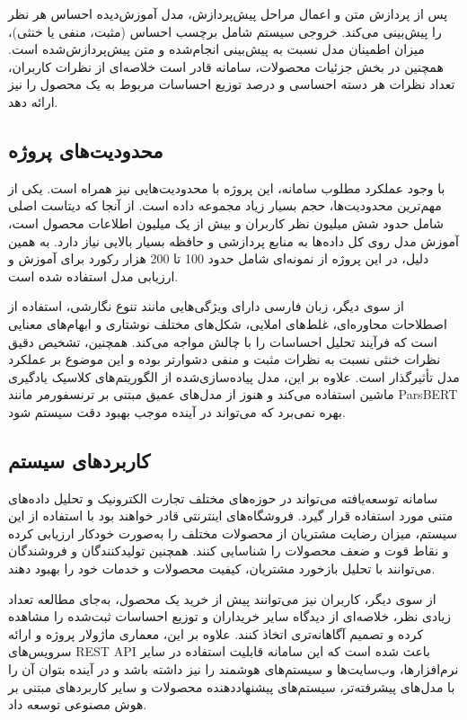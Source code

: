 پس از پردازش متن و اعمال مراحل پیش‌پردازش، مدل آموزش‌دیده احساس هر نظر را پیش‌بینی می‌کند. خروجی سیستم شامل برچسب احساس (مثبت، منفی یا خنثی)، میزان اطمینان مدل نسبت به پیش‌بینی انجام‌شده  و متن پیش‌پردازش‌شده است. همچنین در بخش جزئیات محصولات، سامانه قادر است خلاصه‌ای از نظرات کاربران، تعداد نظرات هر دسته احساسی و درصد توزیع احساسات مربوط به یک محصول را نیز ارائه دهد.
\subsection{محدودیت‌های پروژه}
با وجود عملکرد مطلوب سامانه، این پروژه با محدودیت‌هایی نیز همراه است. یکی از مهم‌ترین محدودیت‌ها، حجم بسیار زیاد مجموعه داده است. از آنجا که دیتاست اصلی شامل حدود شش میلیون نظر کاربران و بیش از یک میلیون اطلاعات محصول است، آموزش مدل روی کل داده‌ها به منابع پردازشی و حافظه بسیار بالایی نیاز دارد. به همین دلیل، در این پروژه از نمونه‌ای شامل حدود 100 تا 200 هزار رکورد برای آموزش و ارزیابی مدل استفاده شده است.

از سوی دیگر، زبان فارسی دارای ویژگی‌هایی مانند تنوع نگارشی، استفاده از اصطلاحات محاوره‌ای، غلط‌های املایی، شکل‌های مختلف نوشتاری و ابهام‌های معنایی است که فرآیند تحلیل احساسات را با چالش مواجه می‌کند. همچنین، تشخیص دقیق نظرات خنثی نسبت به نظرات مثبت و منفی دشوارتر بوده و این موضوع بر عملکرد مدل تأثیرگذار است. علاوه بر این، مدل پیاده‌سازی‌شده از الگوریتم‌های کلاسیک یادگیری ماشین استفاده می‌کند و هنوز از مدل‌های عمیق مبتنی بر ترنسفورمر مانند ParsBERT بهره نمی‌برد که می‌تواند در آینده موجب بهبود دقت سیستم شود.
\subsection{کاربردهای سیستم}
سامانه توسعه‌یافته می‌تواند در حوزه‌های مختلف تجارت الکترونیک و تحلیل داده‌های متنی مورد استفاده قرار گیرد. فروشگاه‌های اینترنتی قادر خواهند بود با استفاده از این سیستم، میزان رضایت مشتریان از محصولات مختلف را به‌صورت خودکار ارزیابی کرده و نقاط قوت و ضعف محصولات را شناسایی کنند. همچنین تولیدکنندگان و فروشندگان می‌توانند با تحلیل بازخورد مشتریان، کیفیت محصولات و خدمات خود را بهبود دهند.

از سوی دیگر، کاربران نیز می‌توانند پیش از خرید یک محصول، به‌جای مطالعه تعداد زیادی نظر، خلاصه‌ای از دیدگاه سایر خریداران و توزیع احساسات ثبت‌شده را مشاهده کرده و تصمیم آگاهانه‌تری اتخاذ کنند. علاوه بر این، معماری ماژولار پروژه و ارائه سرویس‌های REST API باعث شده است که این سامانه قابلیت استفاده در سایر نرم‌افزارها، وب‌سایت‌ها و سیستم‌های هوشمند را نیز داشته باشد و در آینده بتوان آن را با مدل‌های پیشرفته‌تر، سیستم‌های پیشنهاددهنده محصولات و سایر کاربردهای مبتنی بر هوش مصنوعی توسعه داد.
